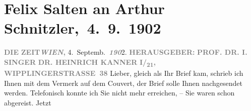 

         
         \renewcommand{\erwaehntePersonen}{Personen: Heinrich Kanner, Isidor Singer}
         \renewcommand{\erwaehnteInstitutionen}{Institutionen: Die Zeit}
         \renewcommand{\erwaehnteOrte}{Orte: Wien, Wipplingerstraße}
         \renewcommand{\erwaehnteWerke}{Werke: Die griechische Tänzerin. Novellette, Die kleine Veronika}
               \section[ Felix Salten an Arthur Schnitzler, 4. 9. 1902]{ Felix Salten an Arthur Schnitzler, 4. 9. 1902}\nopagebreak{}\rehead{ }\begin{ledgroupsized}[t]{13cm}\normalsize\beginnumbering \toendnotes[C]{\smallbreak\pagebreak[2]} 
\toendnotes[C]{\smallbreak}\pstart
           \noindent{}{\pb}\textcolor{gray}{\textbf{DIE}}\pend
           \pstart
           \textcolor{gray}{\textbf{ZEIT}}\hfill \textcolor{gray}{\textbf{\emph{WIEN},}}{ }4. Septemb. \textcolor{gray}{\textbf{\emph{190}}}2.\pend
           \pstart
           \textcolor{gray}{\textbf{\textsc{\textbf{}}}}\pend
           \pstart
           \textcolor{gray}{\textbf{HERAUSGEBER:}}\pend
           \pstart
           \textcolor{gray}{\textbf{\textbf{PROF. DR. I. SINGER}}}\pend
           \pstart
           \textcolor{gray}{\textbf{\textbf{DR. HEINRICH KANNER}}}\pend
           \pstart
           \textcolor{gray}{\textbf{\textbf{}}}\pend
           \pstart
           \textcolor{gray}{\textbf{I/\textsubscript{21},
                           WIPPLINGERSTRASSE 38}}\pend
           \pstart
           Lieber, gleich als Ihr Brief kam, schrieb ich Ihnen
               mit dem Vermerk auf dem Couvert, der Brief solle Ihnen nachgesendet werden.
               Telefonisch konnte ich Sie nicht mehr erreichen, – Sie waren schon abgereist. Jetzt

\end{ledgroupsized}
